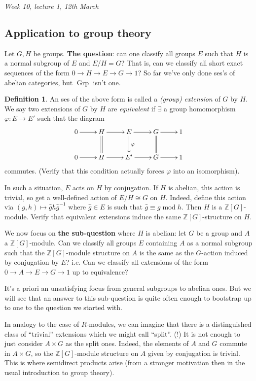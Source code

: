 \documentclass{article}
\newcommand{\Z}{\mathbb{Z}}
\newcommand{\Grp}{{\operatorname{Grp}}}
\newcommand{\Mod}{\operatorname{mod}}
\theoremstyle{definition}
\newtheorem{defn}{Definition}[subsection]
\begin{document}
\begin{flushright}
\textit{Week 10, lecture 1, 12th March}
\end{flushright}

\subsection{Application to group theory}
Let $G,H$ be groups. \textbf{The question}: can one classify all groups $E$ such that $H$ is a normal subgroup of $E$ and $E/H=G$? That is, can we classify all short exact sequences of the form $0\rightarrow H\rightarrow E\rightarrow G\rightarrow 1$? So far we've only done ses's of abelian categories, but $\Grp$ isn't one.

\begin{defn}
An ses of the above form is called a \textit{(group) extension} of $G$ by $H$. We say two extensions of $G$ by $H$ are \textit{equivalent} if $\exists$ a group homomorphism $\varphi:E\rightarrow E'$ such that the diagram
\[
\xymatrix{
0\ar[r] & H\ar[r]\ar@{=}[d] & E\ar[r]\ar[d]^\varphi & G\ar[r]\ar@{=}[d] & 1 \\
0\ar[r] & H\ar[r] & E'\ar[r] & G\ar[r] & 1 \\
}
\]
commutes. (Verify that this condition actually forces $\varphi$ into an isomorphism).
\end{defn}
In such a situation, $E$ acts on $H$ by conjugation. If $H$ is abelian, this action is trivial, so get a well-defined action of $E/H\cong G$ on $H$. Indeed, define this action via $(g,h)\mapsto \widehat gh\widehat g^{-1}$ where $\widehat g\in E$ is such that $\widehat g\equiv g\Mod h$. Then $H$ is a $\Z[G]$-module. Verify that equivalent extensions induce the same $\Z[G]$-structure on $H$.

We now focus on \textbf{the sub-question} where $H$ is abelian: let $G$ be a group and $A$ a $\Z[G]$-module. Can we classify all groups $E$ containing $A$ as a normal subgroup such that the $\Z[G]$-module structure on $A$ is the same as the $G$-action induced by conjugation by $E$? i.e. Can we classify all extensions of the form $0\rightarrow A\rightarrow E\rightarrow G\rightarrow 1$ up to equivalence?

It's a priori an unsatisfying focus from general subgroups to abelian ones. But we will see that an answer to this sub-question is quite often enough to bootstrap up to one to the question we started with.

In analogy to the case of $R$-modules, we can imagine that there is a distinguished class of ``trivial'' extensions which we might call ``split''. (!) It is not enough to just consider $A\times G$ as the split ones. Indeed, the elements of $A$ and $G$ commute in $A\times G$, so the $\Z[G]$-module structure on $A$ given by conjugation is trivial. This is where semidirect products arise (from a stronger motivation then in the usual introduction to group theory).
\end{document}
